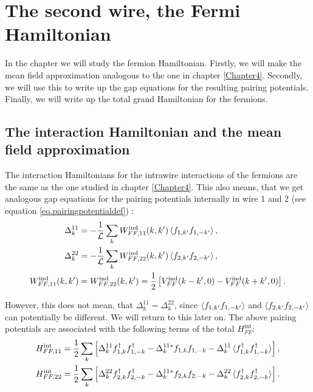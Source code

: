 
\chapter{The second wire, the Fermi Hamiltonian} %

\label{Chapter9} %


In the chapter we will study the fermion Hamiltonian. Firstly, we will make the mean field approximation analogous to the one in chapter \ref{Chapter4}. Secondly, we will use this to write up the gap equations for the resulting pairing potentials. Finally, we will write up the total grand Hamiltonian for the fermions. 

\section{The interaction Hamiltonian and the mean field approximation}
The interaction Hamiltonians for the intrawire interactions of the fermions are the same as the one studied in chapter \ref{Chapter4}. This also means, that we get analogous gap equations for the pairing potentials internally in wire 1 and 2 (see equation \ref{eq.pairingpotentialdef}) :
\begin{align}
\Delta^{11}_k &= -\frac{1}{\mathcal{L}} \sum_k W^\text{ind}_{FF,11}(k,k')\braket{f_{1,k'}f_{1,-k'}}, \nonumber \\
\Delta^{22}_k &= -\frac{1}{\mathcal{L}} \sum_k W^\text{ind}_{FF,22}(k,k')\braket{f_{2,k'}f_{2,-k'}}, \nonumber \\
W^\text{ind}_{FF,11}(k,k') &= W^\text{ind}_{FF,22}(k,k') = \frac{1}{2}\left[V^\text{ind}_{FF}(k-k',0) - V^\text{ind}_{FF}(k+k',0) \right].
\label{eq.pairingpotentialsintrawire}
\end{align}

However, this does not mean, that $\Delta^{11}_k = \Delta^{22}_k$, since $\braket{f_{1,k'}f_{1,-k'}}$ and $\braket{f_{2,k'}f_{2,-k'}}$ can potentially be different. We will return to this later on. The above pairing potentials are associated with the following terms of the total $H^\text{int}_{FF}$:
\begin{align}
H^\text{int}_{FF,11} &= \frac{1}{2}\sum_k \left[\Delta^{11}_k f^\dagger_{1,k}f^\dagger_{1,-k} - \Delta^{11 *}_k f_{1,k}f_{1,-k} - \Delta^{11}_k\braket{f^\dagger_{1,k}f^\dagger_{1,-k}} \right], \nonumber \\
H^\text{int}_{FF,22} &= \frac{1}{2}\sum_k \left[\Delta^{22}_k f^\dagger_{2,k}f^\dagger_{2,-k} - \Delta^{11 *}_k f_{2,k}f_{2,-k} - \Delta^{22}_k\braket{f^\dagger_{2,k}f^\dagger_{2,-k}} \right].
\label{eq.Hintintrawire}
\end{align}

